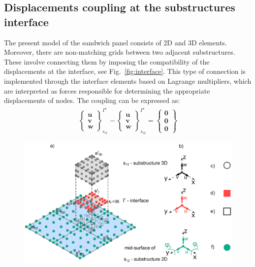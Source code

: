 \documentclass[a4paper,12pt]{article}
\begin{document}
{\subsection{Displacements coupling at the substructures interface}
\label{sec:interface}
The present model of the sandwich panel consists of 2D and 3D elements. 
Moreover, there are non-matching grids between two adjacent substructures. 
These involve connecting them by imposing the compatibility of the displacements at the interface, see Fig.~\ref{fig:interface}.
This type of connection is implemented through the interface elements based on Lagrange multipliers, which are interpreted as forces responsible for determining the appropriate displacements of nodes.
The coupling can be expressed as:
\begin{eqnarray}
\left\{\begin{array}{c}
\textbf{u}\\
\textbf{v}\\
\textbf{w}
\end{array}\right\}_{s_{i1}}^{\Gamma^i}-
\left\{\begin{array}{c}
\textbf{u}\\
\textbf{v}\\
\textbf{w}
\end{array}\right\}_{s_{i2}}^{\Gamma^i}=
\left\{\begin{array}{c}
\textbf{0}\\
\textbf{0}\\
\textbf{0}
\end{array}\right\}
\label{eq:coupling}
\end{eqnarray}
\begin{figure}
	\begin{center}
		\includegraphics[width=1\linewidth]{../../../figures/eps/interface_2D3D.eps}
	\end{center}

\end{figure}}
\end{document}
